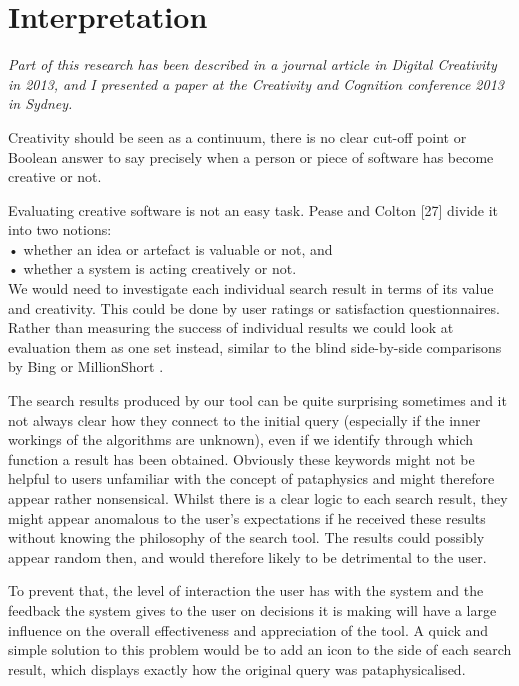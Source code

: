 
\chapter{Interpretation}
\label{ch:interpretation}

\emph{Part of this research has been described in a journal article in Digital Creativity in 2013, and I presented a paper at the Creativity and Cognition conference 2013 in Sydney.}

\grule

\begin{draft}
  Creativity should be seen as a continuum, there is no clear cut-off point or Boolean answer to say precisely when a person or piece of software has become creative or not.
\end{draft}

Evaluating creative software is not an easy task. Pease and Colton [27] divide it into two notions: \\
•	whether an idea or artefact is valuable or not, and\\
•	whether a system is acting creatively or not.\\

We would need to investigate each individual search result in terms of its value and creativity. This could be done by user ratings or satisfaction questionnaires. Rather than measuring the success of individual results we could look at evaluation them as one set instead, similar to the blind side-by-side comparisons by Bing or MillionShort .

The search results produced by our tool can be quite surprising sometimes and it not always clear how they connect to the initial query (especially if the inner workings of the algorithms are unknown), even if we identify through which function a result has been obtained. Obviously these keywords might not be helpful to users unfamiliar with the concept of pataphysics and might therefore appear rather nonsensical. Whilst there is a clear logic to each search result, they might appear anomalous to the user’s expectations if he received these results without knowing the philosophy of the search tool. The results could possibly appear random then, and would therefore likely to be detrimental to the user.

To prevent that, the level of interaction the user has with the system and the feedback the system gives to the user on decisions it is making will have a large influence on the overall effectiveness and appreciation of the tool. A quick and simple solution to this problem would be to add an icon to the side of each search result, which displays exactly how the original query was pataphysicalised.


